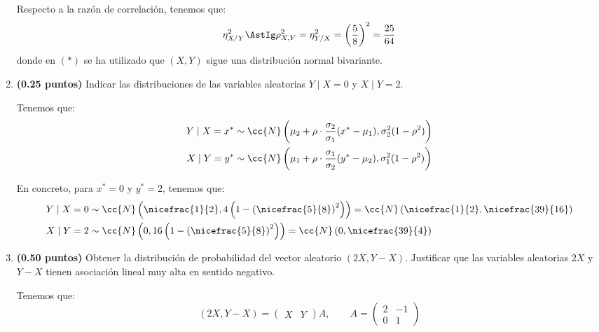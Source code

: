 \documentclass[12pt]{article}
\begin{document}
\begin{ejercicio}[1 puntos]
\begin{enumerate}
            Respecto a la razón de correlación, tenemos que:
            \begin{equation*}
                \eta_{X/Y}^2\AstIg \rho_{X,Y}^2 = \eta_{Y/X}^2=\left(\dfrac{5}{8}\right)^2 = \dfrac{25}{64}
            \end{equation*}
            donde en $(\ast)$ se ha utilizado que $(X,Y)$ sigue una distribución normal bivariante.

            \item \textbf{(0.25 puntos)} Indicar las distribuciones de las variables aleatorias $Y\mid X=0$ y $X\mid Y=2$.
            
            Tenemos que:
            \begin{align*}
                Y\mid X=x^* &\sim \cc{N}\left(\mu_2+\rho\cdot \dfrac{\sigma_2}{\sigma_1}(x^*-\mu_1),\sigma_2^2(1-\rho^2)\right) \\
                X\mid Y=y^* &\sim \cc{N}\left(\mu_1+\rho\cdot \dfrac{\sigma_1}{\sigma_2}(y^*-\mu_2),\sigma_1^2(1-\rho^2)\right)
            \end{align*}

            En concreto, para $x^*=0$ y $y^*=2$, tenemos que:
            \begin{align*}
                Y\mid X=0 &\sim \cc{N}\left(\nicefrac{1}{2},4\left(1-\left(\nicefrac{5}{8}\right)^2\right)\right) = \cc{N}\left(\nicefrac{1}{2},\nicefrac{39}{16}\right) \\
                X\mid Y=2 &\sim \cc{N}\left(0,16\left(1-\left(\nicefrac{5}{8}\right)^2\right)\right) = \cc{N}\left(0,\nicefrac{39}{4}\right)
            \end{align*}
            \item \textbf{(0.50 puntos)} Obtener la distribución de probabilidad del vector aleatorio $(2X, Y-X)$. Justificar que las variables aleatorias $2X$ y $Y-X$ tienen asociación lineal muy alta en sentido negativo.
            
            Tenemos que:
            \begin{equation*}
                (2X,Y-X) = \begin{pmatrix}
                    X & Y
                \end{pmatrix}A,\qquad A = 
                \begin{pmatrix}
                    2 & -1 \\ 0 & 1
                \end{pmatrix}
            \end{equation*}


\end{enumerate}
\end{ejercicio}
\end{document}
